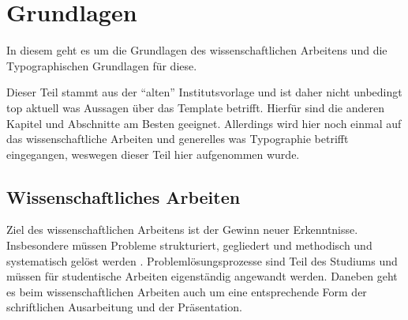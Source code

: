 \makeatletter
\newcommand*{\command}{%
    \begingroup
    \let\do\@makeother
    \dospecials
    \catcode`\{=1 %
    \catcode`\}=2 %
    \@command
}
\newcommand*{\@command}[1]{%
    \endgroup
    \texttt{\detokenize{#1}}%
}
\makeatother

\chapter{Grundlagen}
\label{ch:grundlagen}

In diesem  geht es um die Grundlagen des wissenschaftlichen Arbeitens und die Typographischen Grundlagen für diese.

Dieser Teil stammt aus der \enquote{alten} Institutsvorlage und ist daher nicht unbedingt top aktuell was Aussagen über das Template betrifft. Hierfür sind die anderen Kapitel und Abschnitte am Besten geeignet. Allerdings wird hier noch einmal auf das wissenschaftliche Arbeiten und generelles was Typographie betrifft eingegangen, weswegen dieser Teil hier aufgenommen wurde.

\section{Wissenschaftliches Arbeiten}
\label{sec:Wissenschaftliches_Arbeiten}

Ziel des wissenschaftlichen Arbeitens ist der Gewinn neuer Erkenntnisse. Insbesondere müssen Probleme strukturiert, gegliedert und methodisch und systematisch gelöst werden \cite{Voss}. Problemlösungsprozesse sind Teil des Studiums und müssen für studentische Arbeiten eigenständig angewandt werden. Daneben geht es beim wissenschaftlichen Arbeiten auch um eine entsprechende Form der schriftlichen Ausarbeitung und der Präsentation.

